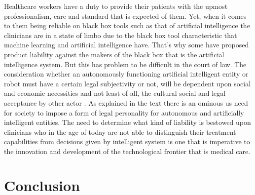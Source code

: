 \documentclass[a4paper,12pt,oneside]{report}
\begin{document}
Healthcare workers have a duty to provide their patients with the upmost professionalism, care and standard that is expected of them. Yet, when it comes to them being reliable on black box tools such as that of artificial intelligence the clinicians are in a state of limbo due to the black box tool characteristic that machine learning and artificial intelligence have. That's why some have proposed product liability against the makers of the black box that is the artificial intelligence system. But this has problem to be difficult in the court of law. The consideration whether an autonomously functioning artificial intelligent entity or robot must have a certain legal subjectivity or not, will be dependent upon social and economic necessities and not least of all, the cultural social and legal acceptance by other actor \cite{5}. As explained in the text there is an ominous us need for society to impose a form of legal personality for autonomous and artificially intelligent entities. The need to determine what kind of liability is bestowed upon clinicians who in the age of today are not able to distinguish their treatment capabilities from decisions given by intelligent system is one that is imperative to the innovation and development of the technological frontier that is medical care. 


\chapter{Conclusion}
\end{document}
